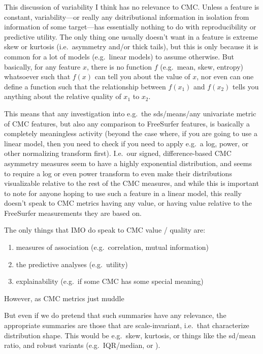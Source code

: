 \documentclass{article}
\begin{document}
This discussion of variability I think has no relevance to CMC\@. Unless a
feature is constant, variability---or really any dsitributional information
in isolation from information of some target---has essentially nothing to do
with reproducibility or predictive utility. The only thing one usually
doesn't want in a feature is extreme skew or kurtosis (i.e.\ asymmetry and/or
thick tails), but this is only because it is common for a lot of models
(e.g.\ linear models) to assume otherwise. But basically, for any feature
\(x\), there is no function \(f\) (e.g.\ mean, skew, entropy) whatsoever such
that \(f(x)\) can tell you about the value of \(x\), nor even can one define
a function such that the relationship between \(f(x_1)\) and \(f(x_2)\) tells
you anything about the relative quality of \(x_1\) to \(x_2\).

This means that any investigation into e.g.\ the sds/means/any univariate
metric of CMC features, but also any comparison to FreeSurfer features, is
basically a completely meaningless activity (beyond the case where, if you
are going to use a linear model, then you need to check if you need to apply
e.g.\ a log, power, or other normalizing transform first). I.e.\ our signed,
difference-based CMC asymmetry measures seem to have a highly exponential
distribution, and seems to require a log or even power transform to even make
their distributions visualizable relative to the rest of the CMC measures,
and while this is important to note for anyone hoping to use such a feature
in a linear model, this really doesn't speak to CMC metrics having any value,
or having value relative to the FreeSurfer measurements they are based on.

The only things that IMO do speak to CMC value / quality are:

\begin{enumerate}
	\item measures of association (e.g.\ correlation, mutual information)
	\item the predictive analyses (e.g.\ utility)
	\item explainability (e.g.\ if some CMC has some special meaning)
\end{enumerate}

However, as CMC metrics just muddle



But even if we do pretend that such summaries have any relevance, the appropriate
summaries are those that are scale-invariant, i.e.\ that characterize distribution
shape. This would be e.g.\ skew, kurtosis, or things like the sd/mean ratio, and
robust variants (e.g.\ IQR/median, or ).
\end{document}
